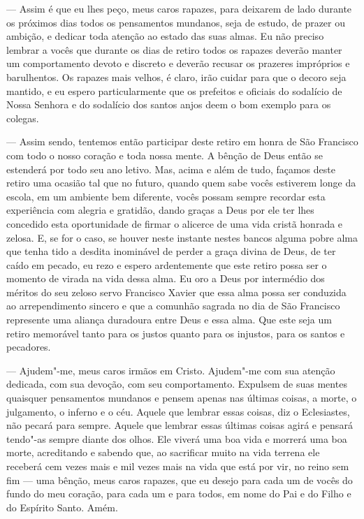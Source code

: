  --- Assim é que eu lhes peço, meus caros rapazes, para deixarem de lado
durante os próximos dias todos os pensamentos mundanos, seja de estudo,
de prazer ou ambição, e dedicar toda atenção ao estado das suas almas.
Eu não preciso lembrar a vocês que durante os dias de retiro todos os
rapazes deverão manter um comportamento devoto e discreto e deverão
recusar os prazeres impróprios e barulhentos. Os rapazes mais velhos, é
claro, irão cuidar para que o decoro seja mantido, e eu espero
particularmente que os prefeitos e oficiais do sodalício de Nossa
Senhora e do sodalício dos santos anjos deem o bom exemplo para os
colegas.

 --- Assim sendo, tentemos então participar deste retiro em honra de São
Francisco com todo o nosso coração e toda nossa mente. A bênção de Deus
então se estenderá por todo seu ano letivo. Mas, acima e além de tudo,
façamos deste retiro uma ocasião tal que no futuro, quando quem sabe
vocês estiverem longe da escola, em um ambiente bem diferente, vocês
possam sempre recordar esta experiência com alegria e gratidão, dando
graças a Deus por ele ter lhes concedido esta oportunidade de firmar o
alicerce de uma vida cristã honrada e zelosa. E, se for o caso, se
houver neste instante nestes bancos alguma pobre alma que tenha tido a
desdita inominável de perder a graça divina de Deus, de ter caído em
pecado, eu rezo e espero ardentemente que este retiro possa ser o
momento de virada na vida dessa alma. Eu oro a Deus por intermédio dos
méritos do seu zeloso servo Francisco Xavier que essa alma possa ser
conduzida ao arrependimento sincero e que a comunhão sagrada no dia de
São Francisco represente uma aliança duradoura entre Deus e essa alma.
Que este seja um retiro memorável tanto para os justos quanto para os
injustos, para os santos e pecadores.

 --- Ajudem"-me, meus caros irmãos em Cristo. Ajudem"-me com sua atenção
dedicada, com sua devoção, com seu comportamento. Expulsem de suas mentes
quaisquer pensamentos mundanos e pensem apenas nas últimas coisas, a
morte, o julgamento, o inferno e o céu. Aquele que lembrar essas
coisas, diz o Eclesiastes, não pecará para sempre. Aquele que lembrar
essas últimas coisas agirá e pensará tendo"-as sempre diante dos olhos.
Ele viverá uma boa vida e morrerá uma boa morte, acreditando e sabendo
que, ao sacrificar muito na vida terrena ele receberá cem vezes mais e
mil vezes mais na vida que está por vir, no reino sem fim --- uma bênção,
meus caros rapazes, que eu desejo para cada um de vocês do fundo do meu
coração, para cada um e para todos, em nome do Pai e do Filho e do
Espírito Santo. Amém.

